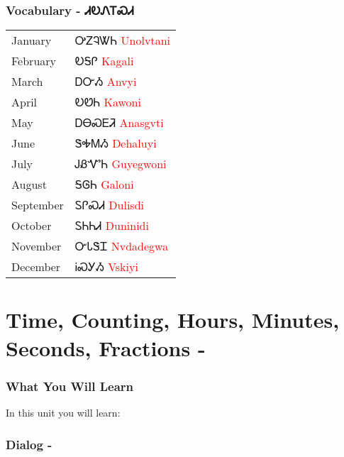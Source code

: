 \subsection{Vocabulary - ᏗᎧᏁᎢᏍᏗ 
}
\begin{tabular}{p{3cm} p{11cm}}
January & ᎤᏃᎸᏔᏂ 
 \newline \textcolor{red}{Unolvtani}\\
February & ᎧᎦᎵ 
 \newline \textcolor{red}{Kagali}\\
March & ᎠᏅᏱ 
 \newline \textcolor{red}{Anvyi}\\
April & ᎧᏬᏂ 
 \newline \textcolor{red}{Kawoni}\\
May & ᎠᎾᏍᎬᏘ 
 \newline \textcolor{red}{Anasgvti}\\
June & ᏕᎭᎷᏱ 
 \newline \textcolor{red}{Dehaluyi}\\
July & ᎫᏰᏉᏂ 
 \newline \textcolor{red}{Guyegwoni}\\
August & ᎦᎶᏂ 
 \newline \textcolor{red}{Galoni}\\
September & ᏚᎵᏍᏗ 
 \newline \textcolor{red}{Dulisdi}\\
October & ᏚᏂᏂᏗ 
 \newline \textcolor{red}{Duninidi}\\
November & ᏅᏓᏕᏆ 
 \newline \textcolor{red}{Nvdadegwa}\\
December & ᎥᏍᎩᏱ 
 \newline \textcolor{red}{Vskiyi}\\
\end{tabular}

\index{}
\chapter{Time, Counting, Hours, Minutes, Seconds, Fractions - }
\subsection{What You Will Learn}
In this unit you will learn:

\subsection{Dialog - }
\\
